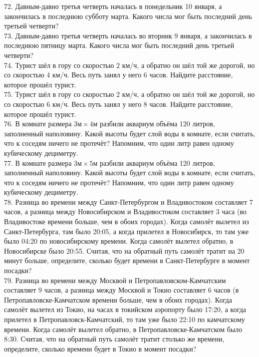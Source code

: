 72. Давным-давно третья четверть началась в понедельник 10 января, а закончилась в последнюю субботу марта. Какого числа мог быть последний день третьей четверти?\\
73. Давным-давно третья четверть началась во вторник 9 января, а закончилась в последнюю пятницу марта. Какого числа мог быть последний день третьей четверти?\\
74. Турист шёл в гору со скоростью 2 км/ч, а обратно он шёл той же дорогой, но со скоростью 4 км/ч. Весь путь занял у него 6 часов. Найдите расстояние, которое прошёл турист.\\
75. Турист шёл в гору со скоростью 2 км/ч, а обратно он шёл той же дорогой, но со скоростью 6 км/ч. Весь путь занял у него 8 часов. Найдите расстояние, которое прошёл турист.\\
76. В комнате размера $3\text{м}\times4\text{м}$ разбили аквариум объёма 120 литров, заполненный наполовину. Какой высоты будет слой воды в комнате, если считать, что к соседям ничего не протечёт? Напомним, что один литр равен одному кубическому дециметру.\\
77. В комнате размера $3\text{м}\times5\text{м}$ разбили аквариум объёма 120 литров, заполненный наполовину. Какой высоты будет слой воды в комнате, если считать, что к соседям ничего не протечёт? Напомним, что один литр равен одному кубическому дециметру.\\
78. Разница во времени между Санкт-Петербургом и Владивостоком составляет 7 часов, а разница между Новосибирском и Владивостоком составляет 3 часа (во Владивостоке времени больше, чем в обоих городах). Когда самолёт вылетел из Санкт-Петербурга, там было 20:05, а когда прилетел в Новосибирск, то там уже было 04:20 по новосибирскому времени. Когда самолёт вылетел обратно, в Новосибирске было 20:55. Считая, что на обратный путь самолёт тратит на 20 минут больше, определите, сколько будет времени в Санкт-Петербурге в момент посадки?\\
79. Разница во времени между Москвой и Петропавловском-Камчатским составляет 9 часов, а разница между Москвой и Токио составляет 6 часов (в Петропавловске-Камчатском времени больше, чем в обоих городах). Когда самолёт вылетел из Токио, на часах в токийском аэропорту было 17:20, а когда прилетел в Петропавловск-Камчатский, то там уже было 22:10 по камчатскому времени. Когда самолёт вылетел обратно, в Петропавловске-Камчатском было 8:30. Считая, что на обратный путь самолёт тратит столько же времени, определите, сколько времени будет в Токио в момент посадки?\\
